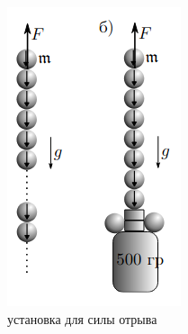 \documentclass[a4paper, 12pt]{article}
\begin{document}
\begin{figure}[htbp]
\begin{subfigure}{0.2\textwidth}
            \centering
            \includegraphics[width=\linewidth]{p2.png}
            \caption{установка для силы отрыва}
            \label{установка для силы отрыва}
        \end{subfigure}
        \hspace{2cm}
        \begin{subfigure}{0.2\textwidth}
            \centering

\end{subfigure}
\end{figure}
\end{document}
